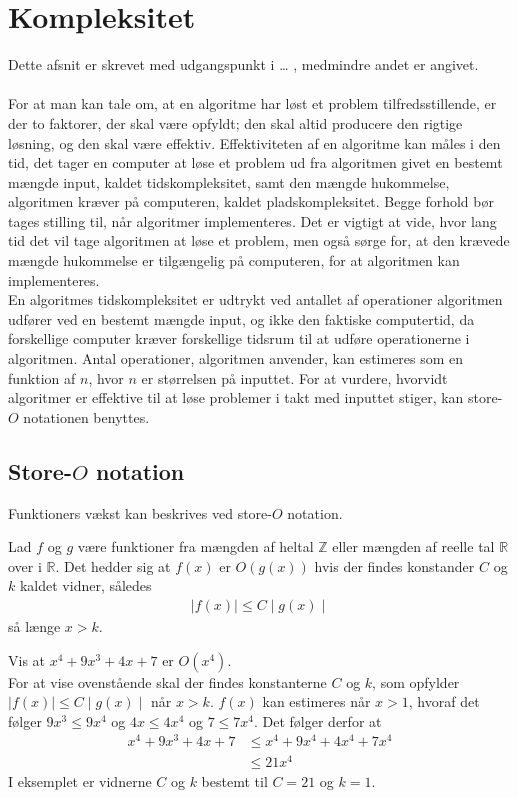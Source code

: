 \chapter{Kompleksitet}
Dette afsnit er skrevet med udgangspunkt i … , medmindre andet er angivet. \\ \\
For at man kan tale om, at en algoritme har løst et problem tilfredsstillende, er der to faktorer, der skal være opfyldt; den skal altid producere den rigtige løsning, og den skal være effektiv. 
Effektiviteten af en algoritme kan måles i den tid, det tager en computer at løse et problem ud fra algoritmen givet en bestemt mængde input, kaldet tidskompleksitet, samt den mængde hukommelse, algoritmen kræver på computeren, kaldet pladskompleksitet. 
Begge forhold bør tages stilling til, når algoritmer implementeres.
Det er vigtigt at vide, hvor lang tid det vil tage algoritmen at løse et problem, men også sørge for, at den krævede mængde hukommelse er tilgængelig på computeren, for at algoritmen kan implementeres. 
\\ En algoritmes tidskompleksitet er udtrykt ved antallet af operationer algoritmen udfører ved en bestemt mængde input, og ikke den faktiske computertid, da forskellige computer kræver forskellige tidsrum til at udføre operationerne i algoritmen. 
Antal operationer, algoritmen anvender, kan estimeres som en funktion af $n$, hvor $n$ er størrelsen på inputtet. 
For at vurdere, hvorvidt algoritmer er effektive til at løse problemer i takt med inputtet stiger, kan store-$O$ notationen benyttes.

\section{Store-$O$ notation}
Funktioners vækst kan beskrives ved store-$O$ notation. \\
\begin{defn}
	Lad $f$ og $g$ være funktioner fra mængden af heltal $\mathbb{Z}$ eller mængden af reelle tal $\mathbb{R}$ over i $\mathbb{R}$. Det hedder sig at $f(x)$ er $O(g(x))$ hvis der findes konstander $C$ og $k$ kaldet vidner, således 
\begin{align*}
\mid f(x) \mid \leq C \mid g(x) \mid
\end{align*}
så længe $x>k$.
\end{defn}

\begin{exmp}
Vis at $x^4+9x^3+4x+7$ er $O(x^4)$. \\
For at vise ovenstående skal der findes konstanterne $C$ og $k$, som opfylder $\mid f(x) \mid \leq C \mid g(x) \mid$ når $x>k$. $f(x)$ kan estimeres når $x>1$, hvoraf det følger $9x^3\leq 9x^4$ og $4x\leq 4x^4$ og $7\leq 7x^4$. Det følger derfor at 
\begin{align*}
x^4+9x^3+4x+7 &\leq x^4+9x^4+4x^4+7x^4 \\
&\leq 21x^4
\end{align*}
I eksemplet er vidnerne $C$ og $k$ bestemt til $C=21$ og $k=1$.
\end{exmp}

